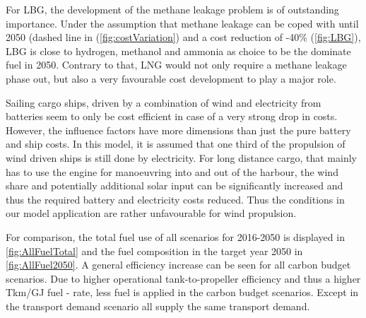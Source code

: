 \documentclass[article]{elsarticle}
\begin{document}
For LBG, the development of the methane leakage problem is of outstanding importance. Under the assumption that methane leakage can be coped with until 2050 (dashed line in (\autoref{fig:costVariation}) and a cost reduction of -40\% (\autoref{fig:LBG}), LBG is close to hydrogen, methanol and ammonia as choice to be the dominate fuel in 2050. Contrary to that, LNG would not only require a methane leakage phase out, but also a very favourable cost development to play a major role.


Sailing cargo ships, driven by a combination of wind and electricity from batteries seem to only be cost efficient in case of a very strong drop in costs. However, the influence factors have more dimensions than just the pure battery and ship costs. In this model, it is assumed that one third of the propulsion of wind driven ships is still done by electricity. For long distance cargo, that mainly has to use the engine for manoeuvring into and out of the harbour, the wind share and potentially additional solar input can be significantly increased and thus the required battery and electricity costs reduced. Thus the conditions in our model application are rather unfavourable for wind propulsion.

For comparison, the total fuel use of all scenarios for 2016-2050 is displayed in \autoref{fig:AllFuelTotal} and the fuel composition in the target year 2050 in \autoref{fig:AllFuel2050}. A general efficiency increase can be seen for all carbon budget scenarios. Due to higher operational tank-to-propeller efficiency and thus a higher Tkm/GJ fuel - rate, less fuel is applied in the carbon budget scenarios. Except in the transport demand scenario all supply the same transport demand.
\end{document}
